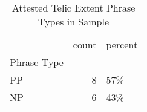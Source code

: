 \begin{table}[htbp!]
\centering
\caption{Attested Telic Extent Phrase Types in Sample}
\label{table:telic_phtype_ct}
\begin{tabular}{lrl}
\toprule
{} &  count & percent \\
Phrase Type &        &         \\
\midrule
PP          &      8 &     57\% \\
NP          &      6 &     43\% \\
\bottomrule
\end{tabular}
\end{table}
